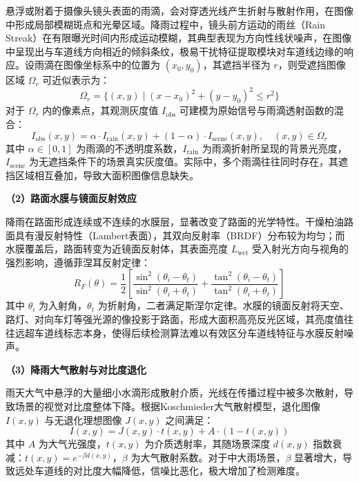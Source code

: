 悬浮或附着于摄像头镜头表面的雨滴，会对穿透光线产生折射与散射作用，在图像中形成局部模糊斑点和光晕区域。降雨过程中，镜头前方运动的雨丝（Rain Streak）在有限曝光时间内形成运动模糊，其典型表现为方向性线状噪声，在图像中呈现出与车道线方向相近的倾斜条纹，极易干扰特征提取模块对车道线边缘的响应。设雨滴在图像坐标系中的位置为 $(x_0, y_0)$，其遮挡半径为 $r$，则受遮挡图像区域 $\Omega_r$ 可近似表示为：
\begin{equation}
	\Omega_r = \{(x, y) \mid (x - x_0)^2 + (y - y_0)^2 \leq r^2\}
\end{equation}
对于 $\Omega_r$ 内的像素点，其观测灰度值 $I_\text{obs}$ 可建模为原始信号与雨滴透射函数的混合：
\begin{equation}
	I_\text{obs}(x, y) = \alpha \cdot I_\text{rain}(x, y) + (1 - \alpha) \cdot I_\text{scene}(x, y), \quad (x, y) \in \Omega_r
	\label{eq:raindrop_model}
\end{equation}
其中 $\alpha \in [0,1]$ 为雨滴的不透明度系数，$I_\text{rain}$ 为雨滴折射所呈现的背景光亮度，$I_\text{scene}$ 为无遮挡条件下的场景真实灰度值。实际中，多个雨滴往往同时存在，其遮挡区域相互叠加，导致大面积图像信息缺失。


\textbf{（2）路面水膜与镜面反射效应}

降雨在路面形成连续或不连续的水膜层，显著改变了路面的光学特性。干燥柏油路面具有漫反射特性（Lambert表面），其双向反射率（BRDF）分布较为均匀；而水膜覆盖后，路面转变为近镜面反射体，其表面亮度 $L_\text{wet}$ 受入射光方向与视角的强烈影响，遵循菲涅耳反射定律\cite{fresnel}：
\begin{equation}
	R_F(\theta) = \frac{1}{2} \left[ \frac{\sin^2(\theta_i - \theta_t)}{\sin^2(\theta_i + \theta_t)} + \frac{\tan^2(\theta_i - \theta_t)}{\tan^2(\theta_i + \theta_t)} \right]
	\label{eq:fresnel}
\end{equation}
其中 $\theta_i$ 为入射角，$\theta_t$ 为折射角，二者满足斯涅尔定律。水膜的镜面反射将天空、路灯、对向车灯等强光源的像投影于路面，形成大面积高亮反光区域，其亮度值往往远超车道线标志本身，使得后续检测算法难以有效区分车道线特征与水膜反射噪声。


\textbf{（3）降雨大气散射与对比度退化}

雨天大气中悬浮的大量细小水滴形成散射介质，光线在传播过程中被多次散射，导致场景的视觉对比度整体下降。根据Koschmieder大气散射模型，退化图像 $I(x,y)$ 与无退化理想图像 $J(x,y)$ 之间满足：
\begin{equation}
	I(x, y) = J(x, y) \cdot t(x, y) + A \cdot (1 - t(x, y))
	\label{eq:koschmieder}
\end{equation}
其中 $A$ 为大气光强度，$t(x,y)$ 为介质透射率，其随场景深度 $d(x,y)$ 指数衰减：$t(x,y) = e^{-\beta d(x,y)}$，$\beta$ 为大气散射系数。对于中大雨场景，$\beta$ 显著增大，导致远处车道线的对比度大幅降低，信噪比恶化，极大增加了检测难度。

